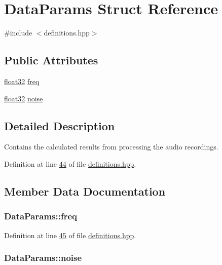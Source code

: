 \hypertarget{structDataParams}{\section{Data\+Params Struct Reference}
\label{structDataParams}
}


{\ttfamily \#include $<$definitions.\+hpp$>$}

\subsection*{Public Attributes}
\begin{DoxyCompactItemize}
\item 
\hyperlink{definitions_8hpp_aacdc525d6f7bddb3ae95d5c311bd06a1}{float32} \hyperlink{structDataParams_a12566e017407647bc8287d62554ad3fb}{freq}
\item 
\hyperlink{definitions_8hpp_aacdc525d6f7bddb3ae95d5c311bd06a1}{float32} \hyperlink{structDataParams_a4efd1d2231c6fa7c878c9d5e1650738f}{noise}
\end{DoxyCompactItemize}


\subsection{Detailed Description}
Contains the calculated results from processing the audio recordings. 

Definition at line \hyperlink{definitions_8hpp_source_l00044}{44} of file \hyperlink{definitions_8hpp_source}{definitions.\+hpp}.



\subsection{Member Data Documentation}
\hypertarget{structDataParams_a12566e017407647bc8287d62554ad3fb}{
\subsubsection[{freq}]{ Data\+Params\+::freq}}\label{structDataParams_a12566e017407647bc8287d62554ad3fb}


Definition at line \hyperlink{definitions_8hpp_source_l00045}{45} of file \hyperlink{definitions_8hpp_source}{definitions.\+hpp}.

\hypertarget{structDataParams_a4efd1d2231c6fa7c878c9d5e1650738f}{
\subsubsection[{noise}]{ Data\+Params\+::noise}}\label{structDataParams_a4efd1d2231c6fa7c878c9d5e1650738f}


